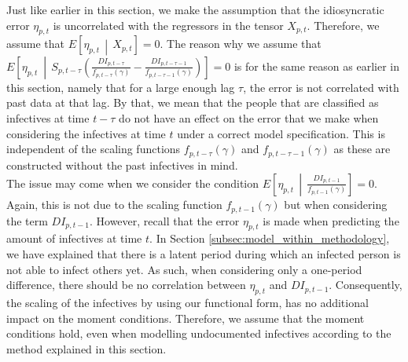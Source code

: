 \documentclass[12pt]{article}
\begin{document}
	Just like earlier in this section, we make the assumption that the idiosyncratic error $\eta_{p,t}$ is uncorrelated with the regressors in the tensor $X_{p,t}$. Therefore, we assume that $E\left[\eta_{p,t} \,\middle|\, X_{p,t}\right] = 0$. The reason why we assume that $E\left[\eta_{p,t} ~\middle|\, S_{p,t-\tau}\left(\frac{DI_{p,t-\tau}}{f_{p,t-\tau}(\gamma)} - \frac{DI_{p,t-\tau-1}}{f_{p,t-\tau-1}(\gamma)}\right)\right] = 0$ is for the same reason as earlier in this section, namely that for a large enough lag $\tau$, the error is not correlated with past data at that lag. By that, we mean that the people that are classified as infectives at time $t-\tau$ do not have an effect on the error that we make when considering the infectives at time $t$ under a correct model specification. This is independent of the scaling functions $f_{p,t-\tau}(\gamma)$ and $f_{p,t-\tau-1}(\gamma)$ as these are constructed without the past infectives in mind. \\
	
	The issue may come when we consider the condition $E\left[\eta_{p,t} \,\middle|\,  \frac{DI_{p,t-1}}{f_{p,t-1}(\gamma)}\right] = 0$. Again, this is not due to the scaling function $f_{p,t-1}(\gamma)$ but when considering the term $DI_{p,t-1}$. However, recall that the error $\eta_{p,t}$ is made when predicting the amount of infectives at time $t$. In Section \ref{subsec:model_within_methodology}, we have explained that there is a latent period during which an infected person is not able to infect others yet. As such, when considering only a one-period difference, there should be no correlation between $\eta_{p,t}$ and $DI_{p,t-1}$. Consequently, the scaling of the infectives by using our functional form, has no additional impact on the moment conditions. Therefore, we assume that the moment conditions hold, even when modelling undocumented infectives according to the method explained in this section. \\
	
\end{document}
